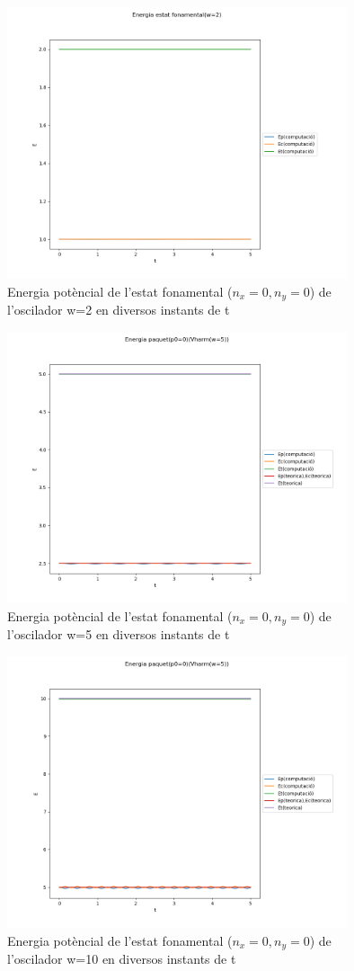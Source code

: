 \documentclass{article}
\begin{document}
\begin{figure}[H]
	\includegraphics[width=\textwidth,height=8cm]{Eharm2.png}
	\caption{Energia potèncial de l'estat fonamental (\(n_x=0,n_y=0\)) de l'oscilador w=2 en diversos instants de t}
\end{figure}
\begin{figure}[H]
	\includegraphics[width=\textwidth,height=8cm]{Eharmpot3.png}
	\caption{Energia potèncial de l'estat fonamental (\(n_x=0,n_y=0\)) de l'oscilador w=5 en diversos instants de t}
\end{figure}
\begin{figure}[H]
	\includegraphics[width=\textwidth,height=8cm]{Eharmpot4.png}
	\caption{Energia potèncial de l'estat fonamental (\(n_x=0,n_y=0\)) de l'oscilador w=10 en diversos instants de t}
\end{figure}
\end{document}
